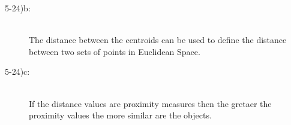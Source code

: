 \documentclass{article}
\begin{document}
\begin{enumerate}
\begin{description}
\item[5-24)b: ] \hfill \\

The distance between the centroids can be used to define the distance between two sets of points in Euclidean Space.

\item[5-24)c: ] \hfill \\

If the distance values are proximity measures then the gretaer the proximity values the more similar are the objects.
 	
\end{description}

\end {enumerate}
\end{document}
